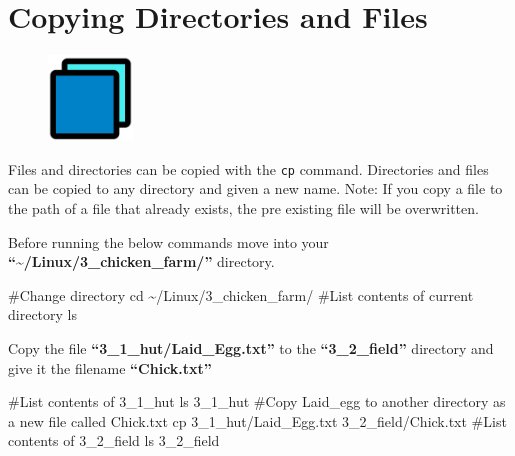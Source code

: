 \documentclass[
  letterpaper,
  DIV=11,
  numbers=noendperiod]{scrreprt}
\newenvironment{Shaded}{\begin{snugshade}}{\end{snugshade}}
\newcommand{\BuiltInTok}[1]{\textcolor[rgb]{0.00,0.23,0.31}{#1}}
\newcommand{\CommentTok}[1]{\textcolor[rgb]{0.37,0.37,0.37}{#1}}
\newcommand{\FunctionTok}[1]{\textcolor[rgb]{0.28,0.35,0.67}{#1}}
\newcommand{\NormalTok}[1]{\textcolor[rgb]{0.00,0.23,0.31}{#1}}
\begin{document}
\hypertarget{copying-directories-and-files}{%
\section{Copying Directories and
Files}\label{copying-directories-and-files}}

\begin{figure}

{\centering \includegraphics[width=0.2\textwidth,height=\textheight]{figures/copy.png}

}

\end{figure}

Files and directories can be copied with the \texttt{cp} command.
Directories and files can be copied to any directory and given a new
name. Note: If you copy a file to the path of a file that already
exists, the pre existing file will be overwritten.

Before running the below commands move into your
\textbf{``\textasciitilde/Linux/3\_chicken\_farm/''} directory.

\begin{Shaded}
\begin{Highlighting}[]
\CommentTok{\#Change directory}
\BuiltInTok{cd}\NormalTok{ \textasciitilde{}/Linux/3\_chicken\_farm/}
\CommentTok{\#List contents of current directory}
\FunctionTok{ls}
\end{Highlighting}
\end{Shaded}

Copy the file \textbf{``3\_1\_hut/Laid\_Egg.txt''} to the
\textbf{``3\_2\_field''} directory and give it the filename
\textbf{``Chick.txt''}

\begin{Shaded}
\begin{Highlighting}[]
\CommentTok{\#List contents of 3\_1\_hut}
\FunctionTok{ls}\NormalTok{ 3\_1\_hut}
\CommentTok{\#Copy Laid\_egg to another directory as a new file called Chick.txt}
\FunctionTok{cp}\NormalTok{ 3\_1\_hut/Laid\_Egg.txt 3\_2\_field/Chick.txt}
\CommentTok{\#List contents of 3\_2\_field}
\FunctionTok{ls}\NormalTok{ 3\_2\_field}
\end{Highlighting}
\end{Shaded}
\end{document}
